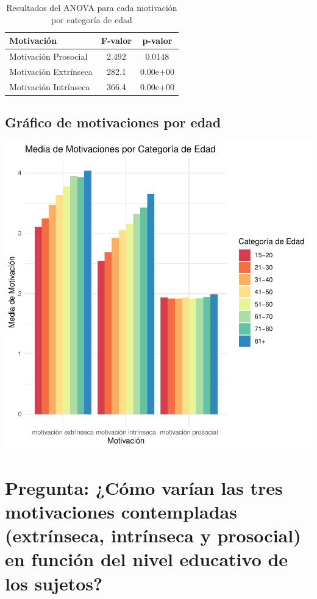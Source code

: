 \documentclass{article}
\begin{document}
\begin{table}[h!]
\centering
\caption{Resultados del ANOVA para cada motivación por categoría de edad}
\begin{tabular}{lcc}
  \toprule
  \textbf{Motivación} & \textbf{F-valor} & \textbf{p-valor} \\
  \midrule
  Motivación Prosocial & 2.492 & 0.0148 \\
  Motivación Extrínseca & 282.1 & 0.00e+00 \\
  Motivación Intrínseca & 366.4 & 0.00e+00 \\
  \bottomrule
\end{tabular}
\end{table}


\subsection{Gráfico de motivaciones por edad}
\includegraphics{Ejemplo-006}



\section{Pregunta: ¿Cómo varían las tres motivaciones contempladas (extrínseca, intrínseca y prosocial) en función del nivel educativo de los sujetos?}
\end{document}
